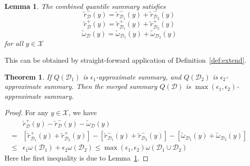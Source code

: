 \documentclass{sig-alternate-05-2015}
\newcommand{\eps}{\epsilon}
\newcommand{\w}{\omega}
\newcommand{\sX}{\mathcal{X}}
\newcommand{\sD}{\mathcal{D}}
\newcommand{\tdr}{\tilde{r}_{\sD}}
\newcommand{\tdrx}[1]{\tilde{r}_{\sD_{#1}}}
\newcommand{\tdw}{\tilde{\omega}_{\sD}}
\newcommand{\tdwx}[1]{\tilde{\omega}_{\sD_{#1}}}
\newtheorem{thm:thm}{Theorem}[section]
\newtheorem{thm:lemma}{Lemma}[section]
\begin{document}
\begin{thm:lemma}\label{lem:merge-extend}
The combined quantile summary satisfies
\begin{equation}
\tdr^-(y) = \tdrx{1}^-(y) + \tdrx{2}^-(y)
\end{equation}
\begin{equation}
\tdr^+(y) = \tdrx{1}^+(y) + \tdrx{2}^+(y)
\end{equation}
\begin{equation}
\tdw(y) =\tdwx{1}(y)+ \tdwx{2}(y)
\end{equation}
for all $y\in \sX$
\end{thm:lemma}
This can be obtained by straight-forward application of Definition~\ref{def:extend}.
\begin{thm:thm}
If $Q(\sD_1)$ is $\eps_1$-approximate summary, and  $Q(\sD_2)$ is $\eps_2$-approximate summary. Then the merged summary $Q(\sD)$ is $\max(\eps_1,\eps_2)$-approximate summary.
\end{thm:thm}
\begin{proof}
For any $y\in \sX$, we have
\begin{equation*}
\begin{split}
&\tdr^+(y) - \tdr^-(y) -\tdw(y)\\
=& [\tdrx{1}^+(y) +\tdrx{2}^+(y)] - [\tdrx{1}^-(y)+\tdrx{2}^-(y)] -[\tdwx{1}(y) + \tdwx{2}(y)]\\
\leq& \eps_1 \w(\sD_1)+\eps_2\w(\sD_2) \leq \max(\eps_1,\eps_2) \w(\sD_1\cup \sD_2)
\end{split}
\end{equation*}
Here the first inequality is due to Lemma~\ref{lem:merge-extend}.
\end{proof}
\end{document}
